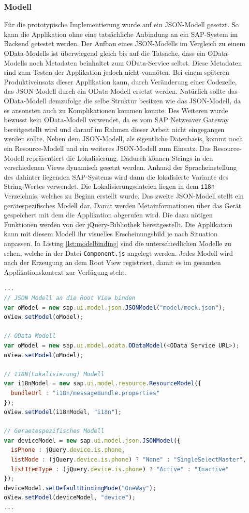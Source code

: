 \subsubsection{Modell}
Für die prototypische Implementierung wurde auf ein JSON-Modell gesetzt. So kann die Applikation ohne eine tatsächliche Anbindung an ein SAP-System im Backend getestet werden. Der Aufbau eines JSON-Modells im Vergleich zu einem OData-Modells ist überwiegend gleich bis auf die Tatsache, dass ein OData-Modells noch Metadaten beinhaltet zum OData-Service selbst. Diese Metadaten sind zum Testen der Applikation jedoch nicht vonnöten. Bei einem späteren Produktiveinsatz dieser Applikation kann, durch Veränderung einer Codezeile, das JSON-Modell durch ein OData-Modell ersetzt werden. Natürlich sollte das OData-Modell demzufolge die selbe Struktur besitzen wie das JSON-Modell, da es ansonsten auch zu Komplikationen kommen könnte. Des Weiteren wurde bewusst kein OData-Modell verwendet, da es vom SAP Netweaver Gateway bereitgestellt wird und darauf im Rahmen dieser Arbeit nicht eingegangen werden sollte. Neben dem JSON-Modell, als eigentliche Datenbasis, kommt noch ein Resource-Modell und ein weiteres JSON-Modell zum Einsatz. Das Resource-Modell repräsentiert die Lokalisierung. Dadurch können Strings in den verschiedenen Views dynamisch gesetzt werden. Anhand der Spracheinstellung des dahinter liegenden SAP-Systems wird dann die lokalisierte Variante des String-Wertes verwendet. Die Lokalisierungsdateien liegen in dem \texttt{i18n} Verzeichnis, welches zu Beginn erstellt wurde. Das zweite JSON-Modell stellt ein gerätespezifisches Modell dar. Damit werden Metainformationen über das Gerät gespeichert mit dem die Applikation abgerufen wird. Die dazu nötigen Funktionen werden von der jQuery-Bibliothek bereitgestellt. Die Applikation kann mit diesem Modell ihr visuelles Erscheinungsbild je nach Situation anpassen. In Listing \ref{lst:modelbinding} sind die unterschiedlichen Modelle zu sehen, welche in der Datei \texttt{Component.js} angelegt werden. Jedes Modell wird nach der Erzeugung an dem Root View registriert, damit es im gesamten Applikationskontext zur Verfügung steht.

\vspace{1em}
\begin{lstlisting}[language=JavaScript, caption=Modell an die Root View binden, label=lst:modelbinding]
...
// JSON Modell an die Root View binden
var oModel = new sap.ui.model.json.JSONModel("model/mock.json");
oView.setModel(oModel);

// OData Modell
var oModel = new sap.ui.model.odata.ODataModel(<OData Service URL>);
oView.setModel(oModel);

// I18N(Lokalisierung) Modell
var i18nModel = new sap.ui.model.resource.ResourceModel({
  bundleUrl : "i18n/messageBundle.properties"
});
oView.setModel(i18nModel, "i18n");

// Geraetespezifisches Modell
var deviceModel = new sap.ui.model.json.JSONModel({
  isPhone : jQuery.device.is.phone,
  listMode : (jQuery.device.is.phone) ? "None" : "SingleSelectMaster",
  listItemType : (jQuery.device.is.phone) ? "Active" : "Inactive"
});
deviceModel.setDefaultBindingMode("OneWay");
oView.setModel(deviceModel, "device");
...
\end{lstlisting}

